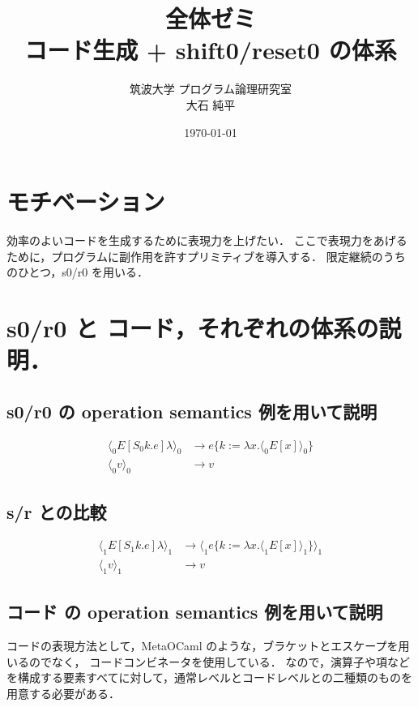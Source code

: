 \documentclass[10pt,a4paper,twocolumn]{jarticle}
\title {\vspace{-4.2cm}全体ゼミ\\ コード生成 + shift0/reset0 の体系}
\date{\today}
\author{筑波大学 プログラム論理研究室 \\ 大石 純平}
\theoremstyle{definition}
\newcommand{\la}{\lambda}
\begin{document}
\maketitle

\section{モチベーション}
効率のよいコードを生成するために表現力を上げたい．
ここで表現力をあげるために，プログラムに副作用を許すプリミティブを導入する．
限定継続のうちのひとつ，s0/r0 を用いる．

\section{s0/r0 と コード，それぞれの体系の説明．}
\subsection{s0/r0 の operation semantics 例を用いて説明}
\begin{align}
  \langle_0 E[S_0 k.e]\la \rangle_0 &\rightarrow e \{k := \la x. \langle_0 E[x] \rangle_0 \} \\
  \langle_0 v \rangle_0 &\rightarrow v
\end{align}

\subsection{s/r との比較}
\begin{align}
  \langle_1 E[S_1 k.e]\la \rangle_1 &\rightarrow \langle_1 e \{k := \la x. \langle_1 E[x] \rangle_1 \} \rangle_1  \\
  \langle_1 v \rangle_1 &\rightarrow v
\end{align}

\subsection{コード の operation semantics 例を用いて説明}
コードの表現方法として，MetaOCaml のような，ブラケットとエスケープを用いるのでなく，
コードコンビネータを使用している．
なので，演算子や項などを構成する要素すべてに対して，通常レベルとコードレベルとの二種類のものを用意する必要がある．

\end{document}
